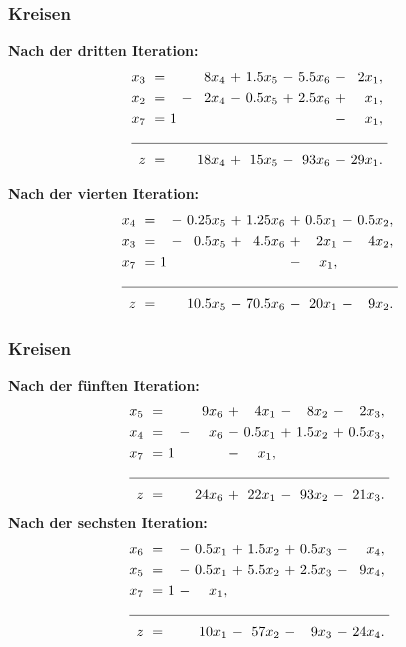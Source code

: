 \documentclass[smaller]{beamer}
\begin{document}
\begin{frame}
 \frametitle{Kreisen}
 \textbf{Nach der dritten Iteration:}
\begin{align*}
\begin{alignedat}{6}
x_3 &\ = &\     &\   &\  8x_4 &\ + &\ 1.5x_5 &\ - &\ 5.5x_6 &\ - &\  2x_1,\ \\
x_2 &\ = &\     &\ - &\  2x_4 &\ - &\ 0.5x_5 &\ + &\ 2.5x_6 &\ + &\   x_1,\ \\
x_7 &\ = &\   1 &\   &\       &\   &\        &\   &\        &\ - &\   x_1,\ \\ \cline{1-11}
z   &\ = &\     &\   &\ 18x_4 &\ + &\  15x_5 &\ - &\  93x_6 &\ - &\ 29x_1.\
\end{alignedat}
\end{align*}

\textbf{Nach der vierten Iteration:}
\begin{align*}
\begin{alignedat}{6}
x_4 &\ = &\     &\ - &\ 0.25x_5 &\ + &\ 1.25x_6 &\ + &\ 0.5x_1 &\ - &\ 0.5x_2,\ \\
x_3 &\ = &\     &\ - &\  0.5x_5 &\ + &\  4.5x_6 &\ + &\   2x_1 &\ - &\   4x_2,\ \\
x_7 &\ = &\   1 &\   &\         &\   &\         &\ - &\    x_1, &\   &\         \\ \cline{1-11}
z   &\ = &\     &\   &\ 10.5x_5 &\ - &\ 70.5x_6 &\ - &\  20x_1 &\ - &\   9x_2.\
\end{alignedat}
\end{align*}
\end{frame}

\begin{frame}
 \frametitle{Kreisen}
 \textbf{Nach der fünften Iteration:}
\begin{align*}
\begin{alignedat}{6}
x_5 &\ = &\     &\   &\  9x_6 &\ + &\   4x_1 &\ - &\   8x_2 &\ - &\   2x_3,\ \\
x_4 &\ = &\     &\ - &\   x_6 &\ - &\ 0.5x_1 &\ + &\ 1.5x_2 &\ + &\ 0.5x_3,\ \\
x_7 &\ = &\   1 &\   &\       &\ - &\    x_1, &\   &\        &\   &\         \\ \cline{1-11}
z   &\ = &\     &\   &\ 24x_6 &\ + &\  22x_1 &\ - &\  93x_2 &\ - &\  21x_3.\
\end{alignedat}
\end{align*}
\textbf{Nach der sechsten Iteration:}
\begin{align*}
\begin{alignedat}{6}
x_6 &\ = &\     &\ - &\ 0.5x_1 &\ + &\ 1.5x_2 &\ + &\ 0.5x_3 &\ - &\   x_4,\ \\
x_5 &\ = &\     &\ - &\ 0.5x_1 &\ + &\ 5.5x_2 &\ + &\ 2.5x_3 &\ - &\  9x_4,\ \\
x_7 &\ = &\   1 &\ - &\    x_1, &\   &\        &\   &\        &\   &\        \\ \cline{1-11}
z   &\ = &\     &\   &\  10x_1 &\ - &\  57x_2 &\ - &\   9x_3 &\ - &\ 24x_4.\
\end{alignedat}
\end{align*}
\end{frame}
\end{document}
